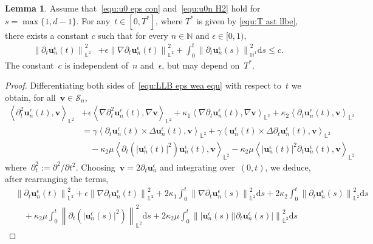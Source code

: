 \documentclass[11pt,reqno]{amsart}
\theoremstyle{definition}
\newtheorem{lemma}[theorem]{Lemma}
\numberwithin{equation}{section}
\newcommand{\bff}{\boldsymbol}
\newcommand{\bb}{\mathbb}
\newcommand{\ds}{\mathrm{d}s}
\newcommand{\pa}{\partial}
\newcommand{\nn}{\nonumber}
\newcommand{\norm}[2]{\left\|{#1}\right\|_{#2}}
\newcommand{\inpro}[2]{\left\langle#1,#2\right\rangle}
\begin{document}
\begin{lemma}\label{lem:ene est 2}
	Assume that~\eqref{equ:u0 eps con} and~\eqref{equ:u0n H2} hold for $s=\max\{1, d-1\}$.
	For any~$t\in[0,T^\ast]$, where $T^\ast$ is given by \eqref{equ:T ast llbe}, there exists a constant $c$ such that for every $n\in\bb{N}$ and $\epsilon\in [0,1)$, 
	\begin{align*}
		\norm{\pa_t\bff{u}_n^\epsilon(t)}{\bb{L}^2}^2
		&+
		\epsilon \norm{\nabla \pa_t\bff{u}_n^\epsilon(t)}{\bb{L}^2}^2
		+
		\int_0^t
		\norm{\pa_t\bff{u}_n^\epsilon(s)}{\bb{H}^1}^2 \ds
		\le c.
	\end{align*}
	The constant~$c$ is independent of~$n$ and~$\epsilon$, but may depend on~$T^\ast$.
\end{lemma}
\begin{proof}
	Differentiating both sides of~\eqref{equ:LLB eps wea equ} with respect 
	to~$t$ we obtain, for all~$\bff{v}\in\mathcal{S}_n$,
	\begin{align}\label{equ:dt2 une}
		\inpro{\pa^2_t\bff{u}_n^\epsilon(t)}{\bff{v}}_{\bb{L}^2}
		&+
		\epsilon \inpro{\nabla\pa^2_t\bff{u}_n^\epsilon(t)}{\nabla\bff{v}}_{\bb{L}^2}
		+
		\kappa_1 \inpro{\nabla\pa_t\bff{u}_n^\epsilon(t)}{\nabla\bff{v}}_{\bb{L}^2}
		+
		\kappa_2
		\inpro{\pa_t\bff{u}_n^\epsilon(t)}{\bff{v}}_{\bb{L}^2}
		\nn\\
		&=
		\gamma
		\inpro{\pa_t\bff{u}_n^\epsilon(t)\times\Delta\bff{u}_n^\epsilon(t)}{\bff{v}}_{\bb{L}^2}
		+
		\gamma
		\inpro{\bff{u}_n^\epsilon(t)\times\Delta\pa_t\bff{u}_n^\epsilon(t)}{\bff{v}}_{\bb{L}^2}
		\nn\\
		&\quad
		-
		\kappa_2\mu
		\inpro{\pa_t(|\bff{u}_n^\epsilon(t)|^2)\bff{u}_n^\epsilon(t)}{\bff{v}}_{\bb{L}^2}
		-
		\kappa_2\mu
		\inpro{|\bff{u}_n^\epsilon(t)|^2\pa_t\bff{u}_n^\epsilon(t)}{\bff{v}}_{\bb{L}^2}
	\end{align}
	where~$\pa_t^2:=\pa^2/\pa t^2$.
	Choosing~$\bff{v}=2\pa_t\bff{u}^\epsilon_n$ and integrating over~$(0,t)$, we
	deduce, after rearranging the terms,
	\begin{align}\label{equ:dt un nab dt}
		\nn
		&\norm{\pa_t\bff{u}^\epsilon_n(t)}{\bb{L}^2}^2
		+
		\epsilon \norm{\nabla\pa_t\bff{u}^\epsilon_n(t)}{\bb{L}^2}^2
		+ 2\kappa_1 \int_0^t \norm{\nabla \pa_t\bff{u}^\epsilon_n(s)}{\bb{L}^2}^2\ds
		+ 2\kappa_2 \int_0^t \norm{\pa_t\bff{u}^\epsilon_n(s)}{\bb{L}^2}^2\ds
		\\
		\nn
		&\quad
		+ \kappa_2\mu \int_0^t \norm{\pa_t(|\bff{u}^\epsilon_n(s)|^2)}{\bb{L}^2}^2\ds
		+2\kappa_2\mu \int_0^t \norm{|\bff{u}^\epsilon_n(s)||\pa_t\bff{u}^\epsilon_n(s)|}{\bb{L}^2}^2\ds

\end{align}
\end{proof}
\end{document}
